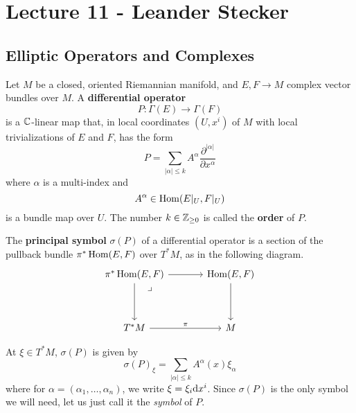 \chapter{Lecture 11 - Leander Stecker}

\section{Elliptic Operators and Complexes}

Let $M$ be a closed, oriented Riemannian manifold, and $E, F \to M$ complex vector bundles over $M$.
A \textbf{differential operator}
\begin{equation*}
  P \colon \Gamma (E) \longrightarrow \Gamma(F)
\end{equation*}
is a $\mathbb{C}$-linear map that, in local coordinates $(U, x^i)$ of $M$ with local trivializations of $E$ and $F$, has the form
\begin{equation*}
  P = \sum_{|\alpha| \leq k} A^\alpha
  \frac{\partial^{|\alpha|} }{\partial x^{\alpha}} 
\end{equation*}
where $\alpha$ is a multi-index and
\begin{equation*}
  A^\alpha \in \operatorname{Hom} ( E |_U, F |_U )
\end{equation*}
is a bundle map over $U$.
The number $k \in \mathbb{Z}_{\geq 0}$ is called the \textbf{order} of $P$.

\begin{definition}
  The \textbf{principal symbol} $\sigma(P)$ of a differential operator is a section of the pullback bundle
  $\pi^* \operatorname{Hom}(E, F)$ over $T^*M$, as in the following diagram.
  \begin{equation*}
    \begin{tikzcd}[sep=large]
      |[label={-45:\lrcorner}]|
      \pi^* \Hom(E, F) \arrow[r] \arrow[d] &
      \Hom(E, F) \arrow[d] \\
      T^* M \arrow[r, "\pi"] &
      M
    \end{tikzcd}
  \end{equation*}
\end{definition}

At $\xi \in T^* M$, $\sigma(P)$ is given by
\begin{equation*}
  \sigma(P)_\xi = \sum_{|\alpha| \leq k} A^\alpha (x) \xi_\alpha
\end{equation*}
where for $\alpha = (\alpha_1, \dots, \alpha_n)$, we write $\xi = \xi_i \mathrm{d} x^i$.
Since $\sigma(P)$ is the only symbol we will need, let us just call it the \textit{symbol} of $P$.

